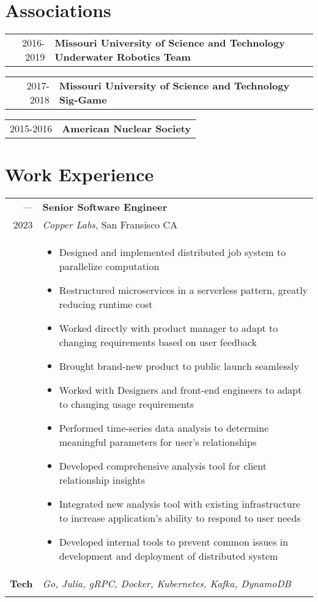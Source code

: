 \documentclass[a4paper,10pt]{article}
\newcommand{\br}{\\\multicolumn{2}{c}{}}
\begin{document}
\section{Associations}
\begin{tabular}{r p{15cm}}
  \textsc{2016-2019} & \textbf{Missouri University of Science and Technology Underwater Robotics Team} \\
\end{tabular}

\begin{tabular}{r p{15cm}}
  \textsc{2017-2018} & \textbf{Missouri University of Science and Technology Sig-Game} \\
\end{tabular}

\begin{tabular}{r p{15cm}}
  \textsc{2015-2016} & \textbf{American Nuclear Society} \\
\end{tabular}

\section{Work Experience}
\begin{tabular}{r p{15cm}}
  \textsc{---}  & \textbf{Senior Software Engineer} \\
  \textsc{2023} & \textit{Copper Labs}, San Fransisco CA
  \\ &  
       \begin{itemize}
       \item Designed and implemented distributed job system to parallelize computation
       \item Restructured microservices in a serverless pattern, greatly reducing runtime cost
       \item Worked directly with product manager to adapt to changing requirements based on user feedback
       \item Brought brand-new product to public launch seamlessly
       \item Worked with Designers and front-end engineers to adapt to changing usage requirements
       \item Performed time-series data analysis to determine meaningful parameters for user's relationships
       \item Developed comprehensive analysis tool for client relationship insights
       \item Integrated new analysis tool with existing infrastructure to increase application's ability to respond to user needs
       \item Developed internal tools to prevent common issues in development and deployment of distributed system
       \end{itemize} \\
  \textbf{Tech} & \textit{Go, Julia, gRPC, Docker, Kubernetes, Kafka, DynamoDB} \br \\
\end{tabular}
\end{document}
